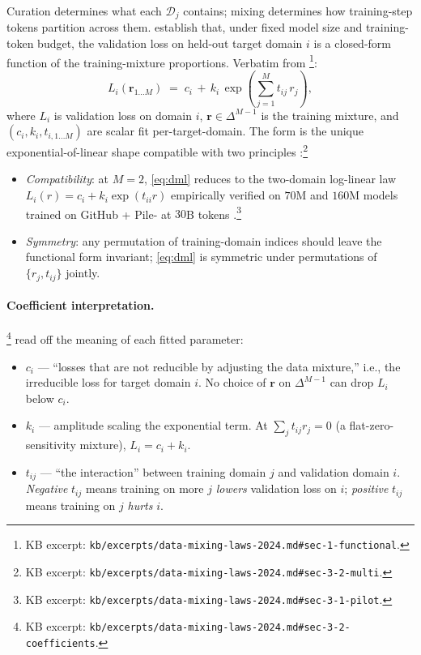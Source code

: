 Curation determines what each $\mathcal{D}_j$ contains; mixing
determines how training-step tokens partition across them.
\citet{data-mixing-laws-2024} establish that, under fixed model size
and training-token budget, the validation loss on held-out target
domain $i$ is a closed-form function of the training-mixture
proportions. Verbatim from
\citet[\S 1, eq.\ 1; \S 3.2, eq.\ 7]{data-mixing-laws-2024}\footnote{KB
excerpt: \nolinkurl{kb/excerpts/data-mixing-laws-2024.md#sec-1-functional}.}:
\begin{equation}
L_i(\mathbf{r}_{1\ldots M}) \;=\; c_i \,+\, k_i \,\exp\!\left(
   \sum_{j=1}^{M} t_{ij}\,r_j
\right),
\label{eq:dml}
\tag{1}
\end{equation}
where $L_i$ is validation loss on domain $i$, $\mathbf{r} \in
\Delta^{M-1}$ is the training mixture, and $(c_i, k_i, t_{i, 1\ldots
M})$ are scalar  fit per-target-domain. The form is the
unique exponential-of-linear shape compatible with two principles
\citep[\S 3.2]{data-mixing-laws-2024}:\footnote{KB excerpt:
\nolinkurl{kb/excerpts/data-mixing-laws-2024.md#sec-3-2-multi}.}

\begin{itemize}
\item \emph{Compatibility}: at $M = 2$, \cref{eq:dml} reduces to the
two-domain log-linear law $L_i(r) = c_i + k_i \exp(t_{ii} r)$
empirically verified on $70$M and $160$M models trained on
GitHub + Pile- at $30$B tokens
\citep[\S 3.1, eq.\ 6]{data-mixing-laws-2024}.\footnote{KB excerpt:
\nolinkurl{kb/excerpts/data-mixing-laws-2024.md#sec-3-1-pilot}.}
\item \emph{Symmetry}: any permutation of training-domain indices
should leave the functional form invariant; \cref{eq:dml} is
symmetric under permutations of $\{r_j, t_{ij}\}$ jointly.
\end{itemize}

\paragraph{Coefficient interpretation.}
\citet[\S 3.2]{data-mixing-laws-2024}\footnote{KB excerpt:
\nolinkurl{kb/excerpts/data-mixing-laws-2024.md#sec-3-2-coefficients}.}
read off the meaning of each fitted parameter:
\begin{itemize}
\item $c_i$ --- ``losses that are not reducible by adjusting the data
mixture,'' i.e., the irreducible loss for target domain $i$. No
choice of $\mathbf{r}$ on $\Delta^{M-1}$ can drop $L_i$ below $c_i$.
\item $k_i$ --- amplitude scaling the exponential term. At
$\sum_j t_{ij} r_j = 0$ (a flat-zero-sensitivity mixture), $L_i =
c_i + k_i$.
\item $t_{ij}$ --- ``the interaction'' between training domain $j$
and validation domain $i$. \emph{Negative} $t_{ij}$ means training
on more $j$ \emph{lowers} validation loss on $i$; \emph{positive}
$t_{ij}$ means training on $j$ \emph{hurts} $i$.
\end{itemize}

